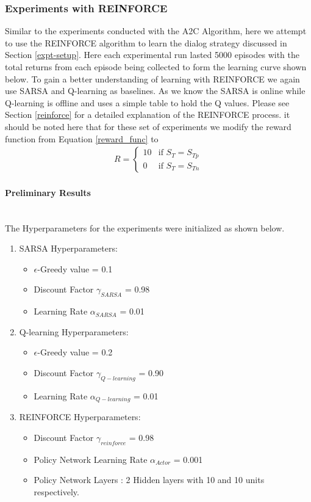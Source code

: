 \documentclass[14pt]{extarticle}
\newcommand{\myparagraph}[1]{\paragraph{#1}\mbox{}\\ \linebreak}
\numberwithin{equation}{section}
\begin{document}
\subsubsection{Experiments with REINFORCE}
Similar to the experiments conducted with the A2C Algorithm, here we attempt to use the REINFORCE algorithm to learn the dialog strategy discussed in Section \ref{expt-setup}. Here each experimental run lasted 5000 episodes with the total returns from each episode being collected to form the learning curve shown below. To gain a better understanding of learning with REINFORCE we again use SARSA and Q-learning\cite{Sutton-introRL} as baselines. As we know the SARSA is online while Q-learning is offline and uses a simple table to hold the Q values. Please see Section \ref{reinforce} for a detailed explanation of the REINFORCE process. it should be noted here that for these set of experiments we modify the reward function from Equation \ref{reward_func} to 
\begin{align}
R = \begin{cases}
10 & \text{if }S_T = S_{Tp} \\    
0 & \text{if }S_T = S_{Tn}
\end{cases}\label{reward_func_10}
\end{align}
	\myparagraph{Preliminary Results}\label{reinf_pre_results}
	The Hyperparameters for the experiments were initialized as shown below.
\begin{enumerate}
	\item SARSA Hyperparameters:
	\begin{itemize}
		\item $\epsilon$-Greedy value = 0.1
		\item Discount Factor $\gamma_{SARSA}$ = 0.98
		\item Learning Rate $\alpha_{SARSA}$ = 0.01
	\end{itemize}
	\item Q-learning Hyperparameters:
	\begin{itemize}
		\item $\epsilon$-Greedy value = 0.2
		\item Discount Factor $\gamma_{Q-learning}$ = 0.90
		\item Learning Rate $\alpha_{Q-learning}$ = 0.01
	\end{itemize}
	\item REINFORCE Hyperparameters:
	\begin{itemize}
		\item Discount Factor $\gamma_{reinforce}$ = 0.98
		\item Policy Network Learning Rate $\alpha_{Actor}$ = 0.001
		\item Policy Network Layers : 2 Hidden layers with 10 and 10 units respectively.
	\end{itemize}
\end{enumerate}
\end{document}
